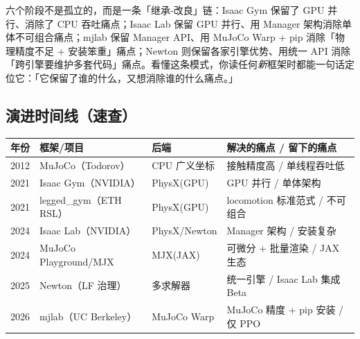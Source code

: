 
\begin{insight}\label{ins:rlmc-eco-pattern}
六个阶段不是孤立的，而是一条「继承-改良」链：Isaac Gym 保留了 GPU 并行、消除了 CPU 吞吐痛点；Isaac Lab 保留 GPU 并行、用 Manager 架构消除单体不可组合痛点；mjlab 保留 Manager API、用 MuJoCo Warp + pip 消除「物理精度不足 + 安装笨重」痛点；Newton 则保留各家引擎优势、用统一 API 消除「跨引擎要维护多套代码」痛点。看懂这条模式，你读任何\emph{新}框架时都能一句话定位它：「它保留了谁的什么，又想消除谁的什么痛点。」
\end{insight}

\subsection{演进时间线（速查）}

\begin{center}
\small
\begin{tabular}{@{}llll@{}}
\toprule
年份 & 框架/项目 & 后端 & 解决的痛点 / 留下的痛点 \\
\midrule
2012 & MuJoCo（Todorov） & CPU 广义坐标 & 接触精度高 / 单线程吞吐低 \\
2021 & Isaac Gym（NVIDIA） & PhysX(GPU) & GPU 并行 / 单体架构 \\
2021 & legged\_gym（ETH RSL） & PhysX(GPU) & locomotion 标准范式 / 不可组合 \\
2024 & Isaac Lab（NVIDIA） & PhysX/Newton & Manager 架构 / 安装复杂 \\
2024 & MuJoCo Playground/MJX & MJX(JAX) & 可微分 + 批量渲染 / JAX 生态 \\
2025 & Newton（LF 治理） & 多求解器 & 统一引擎 / Isaac Lab 集成 Beta \\
2026 & mjlab（UC Berkeley） & MuJoCo Warp & MuJoCo 精度 + pip 安装 / 仅 PPO \\
\bottomrule
\end{tabular}
\end{center}

